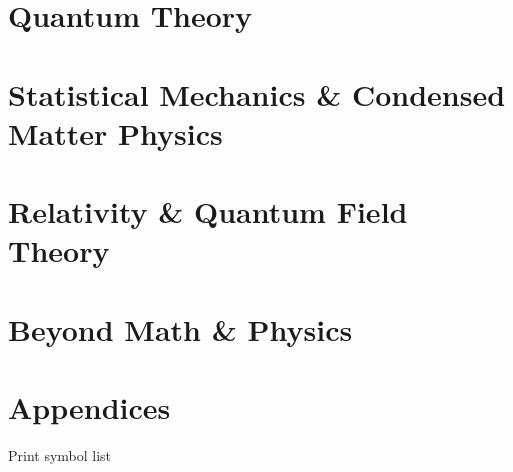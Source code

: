 \documentclass[12pt, a4paper]{report}
\begin{document}
\part{Quantum Theory}\label{part:qm}
\parttoc







\part{Statistical Mechanics \& Condensed Matter Physics}





\part{Relativity \& Quantum Field Theory}
\parttoc













\part{Beyond Math \& Physics}
\parttoc







\part{Appendices}
\parttoc

\begin{appendices}


\end{appendices}

Print symbol list

\printnomenclature



\adjustmtc

\printindex
\printindex[author]
\end{document}
